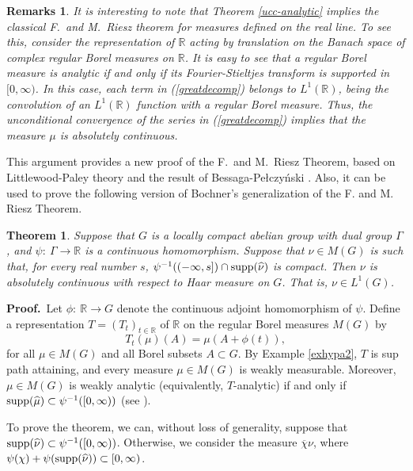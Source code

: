 \documentclass[12pt]{article}
\newcommand{\R}{\mathbb R}
\newcommand{\supp}{{\rm supp}}
\newtheorem{thm}[defin]{Theorem}
\newtheorem{rem}[defin]{Remarks}
\begin{document}
\begin{rem}
{\rm It is interesting to note that
 Theorem \ref{ucc-analytic}
implies the classical
 F.\ and M.\ Riesz theorem for measures defined on the real line.
To see this, consider the representation
of $\R$ acting by translation on the Banach space
of complex regular 
Borel measures on $\R$. 
It is easy to see that a regular Borel measure is analytic
if and only if its Fourier-Stieltjes transform is supported in
$[0,\infty)$. 
In this case, each term in
(\ref{greatdecomp}) belongs to $L^1(\R)$,
being the convolution of an $L^1(\R)$
function with a regular Borel measure.
Thus, the unconditional convergence of the
series in (\ref{greatdecomp}) implies that the
measure $\mu$ is absolutely continuous.
}
\label{classicalf&m}
\end{rem}

This argument provides a 
new proof of the F.\ and M.\ Riesz Theorem,
based on Littlewood-Paley theory and the result of 
Bessaga-Pe\l czy\'nski \cite{bp}.  Also, it can be used to 
prove the following version of Bochner's generalization of the F. and M. Riesz Theorem.

\begin{thm}
Suppose that $G$ is a locally compact abelian group with
dual group $\Gamma$, and $\psi:\ \Gamma \rightarrow \R$ is a 
continuous homomorphism.  Suppose that $\nu\in M(G)$ is such that,
for every real number $s$, 
$\psi^{-1}((-\infty,s])\cap \supp (\widehat{\nu})$ is compact.  
Then $\nu$ is absolutely continuous with 
respect to Haar measure on $G$.  That is, $\nu\in L^1(G)$.
\label{bochner-thm}
\end{thm}
 {\bf Proof.}\ 
Let $\phi:\ \R\rightarrow G$ denote the continuous adjoint homomorphism
of $\psi$.  Define a representation $T=(T_t)_{t\in\R}$ of $\R$ on
the regular Borel measures $M(G)$ by
$$T_t(\mu)(A)=\mu(A+\phi(t)),$$
for all $\mu\in M(G)$ and all Borel subsets $A\subset G$.
By Example \ref{exhypa2}, $T$ is sup path attaining,
and every measure $\mu\in M(G)$ is weakly measurable.
Moreover, $\mu\in M(G)$ is weakly analytic (equivalently, $T$-analytic)
if and only if $\supp (\widehat{\mu})\subset \psi^{-1}([0,\infty))$ (see
\cite{deleeuwglicksberg}).

To prove the theorem, we can, without loss of generality,
suppose that $\supp (\widehat{\nu})\subset \psi^{-1}([0,\infty))$.
Otherwise, we consider the measure $\overline{\chi} \nu$, where 
$\psi(\chi) +\psi(\supp(\widehat{\nu}))\subset [0,\infty)$.
\end{document}
